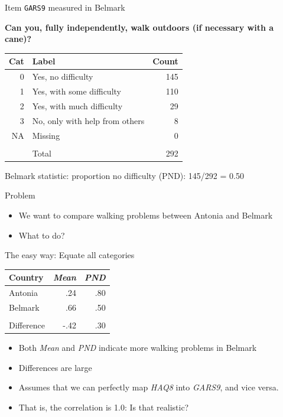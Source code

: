 \documentclass[ignorenonframetext,aspectratio=43]{beamer}
\providecommand{\tightlist}{%
  \setlength{\itemsep}{0pt}\setlength{\parskip}{0pt}}
\begin{document}
\begin{frame}{Item \texttt{GARS9} measured in Belmark}
\protect\hypertarget{item-gars9-measured-in-belmark}{}

\textbf{Can you, fully independently, walk outdoors (if necessary with a
cane)?}

\begin{longtable}[]{@{}rlr@{}}
\toprule
Cat & Label & Count\tabularnewline
\midrule
\endhead
0 & Yes, no difficulty & 145\tabularnewline
1 & Yes, with some difficulty & 110\tabularnewline
2 & Yes, with much difficulty & 29\tabularnewline
3 & No, only with help from others & 8\tabularnewline
NA & Missing & 0\tabularnewline
& &\tabularnewline
& Total & 292\tabularnewline
\bottomrule
\end{longtable}

Belmark statistic: proportion no difficulty (PND): 145/292 = 0.50

\end{frame}

\begin{frame}{Problem}
\protect\hypertarget{problem}{}

\begin{itemize}
\tightlist
\item
  We want to compare walking problems between Antonia and Belmark
\item
  What to do?
\end{itemize}

\end{frame}

\begin{frame}{The easy way: Equate all categories}
\protect\hypertarget{the-easy-way-equate-all-categories}{}

\begin{longtable}[]{@{}lrr@{}}
\toprule
Country & \emph{Mean} & \emph{PND}\tabularnewline
\midrule
\endhead
Antonia & .24 & .80\tabularnewline
Belmark & .66 & .50\tabularnewline
& &\tabularnewline
Difference & -.42 & .30\tabularnewline
\bottomrule
\end{longtable}

\begin{itemize}
\tightlist
\item
  Both \emph{Mean} and \emph{PND} indicate more walking problems in
  Belmark
\item
  Differences are large
\item
  Assumes that we can perfectly map \emph{HAQ8} into \emph{GARS9}, and
  vice versa.
\item
  That is, the correlation is 1.0: Is that realistic?
\end{itemize}

\end{frame}
\end{document}
